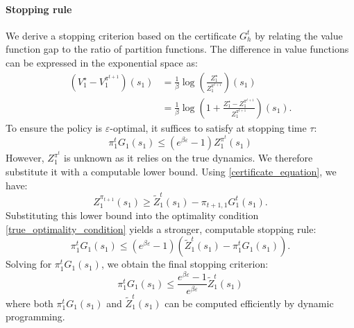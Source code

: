 \documentclass[final,12pt]{colt2026} %
\begin{document}
\paragraph{Stopping rule}\label{stopping_rule_paragrph}
We derive a stopping criterion based on the certificate $G_h^t$ by relating the value function gap to the ratio of partition functions. The difference in value functions can be expressed in the exponential space as:
\begin{align*}
    (V^\star_1 - V^{\pi^{t+1}}_1)(s_1) &= \frac{1}{\beta} \log\left( \frac{Z^\star_1}{Z_1^{\pi^{t+1}}}\right)(s_1) \\
    &= \frac{1}{\beta} \log \left(1 + \frac{Z_1^\star - Z_1^{\pi^{t+1}}}{Z_1^{\pi^{t+1}}} \right)(s_1).
\end{align*}
To ensure the policy is $\varepsilon$-optimal, it suffices to satisfy at stopping time $\tau$:
\begin{equation}\label{true_optimality_condition}
    \pi_1^t G_1(s_1) \leq \left(e^{\beta \varepsilon} - 1\right) Z_1^{\pi^{t}}(s_1)
\end{equation}
However, $Z_1^{\pi^t}$ is unknown as it relies on the true dynamics. We therefore substitute it with a computable lower bound. Using \eqref{certificate_equation}, we have:
\begin{equation*}
    Z_1^{\pi_{t+1}}(s_1) \geq \widetilde{Z}_1^t(s_1) - \pi_{t+1,1}G_1^t(s_1).
\end{equation*}
Substituting this lower bound into the optimality condition \eqref{true_optimality_condition} yields a stronger, computable stopping rule:
\begin{equation*}
    \pi_1^t G_1(s_1) \leq \left(e^{\beta \varepsilon} - 1\right) \left(\widetilde{Z}_1^t(s_1) - \pi_{1}^t G_1(s_1)\right).
\end{equation*}
Solving for $\pi_1^t G_1(s_1)$, we obtain the final stopping criterion:
\begin{equation}\label{computabe_stopping_condition}
    \pi_1^t G_1(s_1) \leq \frac{e^{\beta \varepsilon} - 1}{e^{\beta \varepsilon}} \widetilde{Z}_1^t(s_1) 
\end{equation}
where both $\pi_1^t G_1(s_1)$ and $\widetilde{Z}_1^t(s_1)$ can be computed efficiently by dynamic programming. 
\end{document}
